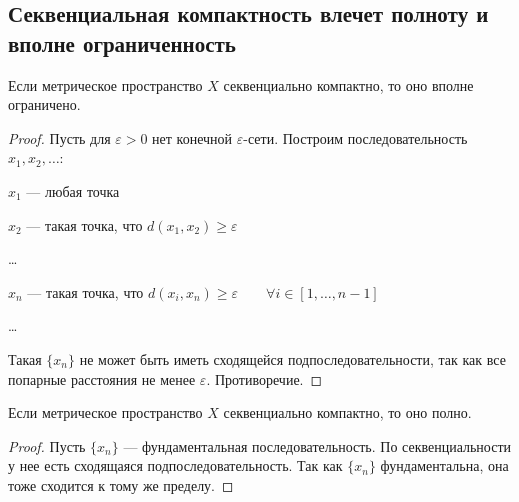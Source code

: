 \documentclass[11pt]{book}
\renewcommand{\ge}{\geqslant}
\theoremstyle{definition}
\theoremstyle{plain}
\theoremstyle{plain}
\theoremstyle{definition}
\theoremstyle{remark}
\begin{document}
\subsection{Секвенциальная компактность влечет полноту и вполне ограниченность}
\begin{thm}\label{th_sec_ogr}
    Если метрическое пространство $ X$ секвенциально компактно, то оно вполне ограничено.
\end{thm}
\begin{proof}
    Пусть для $ \varepsilon > 0$ нет конечной $\varepsilon$-сети.
    Построим последовательность $ x_1, x_2, \ldots $:
    \begin{description}
	\item $ x_1$ ---  любая точка
	\item $ x_2$ ---  такая точка, что  $ d(x_1, x_2) \ge \varepsilon $
	\item \ldots
	\item $ x_n$ --- такая точка, что  $ d(x_i, x_{n}) \ge \varepsilon \qquad \forall i \in [1, \ldots , n-1]$
	\item \ldots
    \end{description}
    Такая $ \{x_{n}\}$ не может быть иметь сходящейся подпоследовательности, так как все попарные расстояния не менее $ \varepsilon $. Противоречие.
\end{proof}
\begin{thm}\label{th_sec_poln}
    Если метрическое пространство $ X$ секвенциально компактно, то оно полно.
\end{thm}
\begin{proof}
    Пусть $ \{x_{n}\}$ --- фундаментальная последовательность. По секвенциальности у нее есть сходящаяся подпоследовательность. Так как $ \{x_{n}\}$ фундаментальна, она тоже сходится к тому же пределу.
\end{proof}
\end{document}
